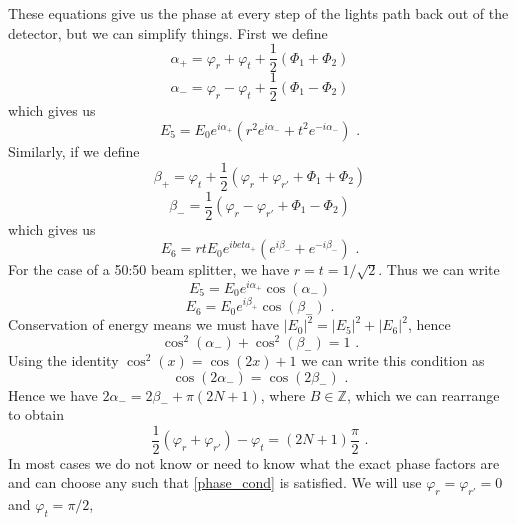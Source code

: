 \documentclass[11pt]{cuthesis}
\newcommand{\fs}{\text{ .}}
\begin{document}
These equations give us the phase at every step of the lights path back out of the detector, but we can simplify things. First we define 
\begin{equation}
\alpha_+ = \varphi_r + \varphi_t + \frac{1}{2}(\Phi_1+\Phi_2)
\end{equation}
\begin{equation}
\alpha_- = \varphi_r - \varphi_t + \frac{1}{2}(\Phi_1- \Phi_2)
\end{equation}
which gives us 
\begin{equation}
E_5=E_0 e^{i \alpha_+}(r^2 e^{i \alpha_-}+t^2 e^{-i \alpha_-}) \fs
\end{equation}
Similarly, if we define
\begin{equation}
\beta_+ = \varphi_t +\frac{1}{2}(\varphi_r+\varphi_{r'}+\Phi_1+\Phi_2)	
\end{equation}
\begin{equation}
\beta_-=\frac{1}{2}(\varphi_r-\varphi_{r'}+\Phi_1-\Phi_2) 
\end{equation}
which gives us 
\begin{equation}
E_6=r t E_0 e^{i beta_+}( e^{i \beta_-}+ e^{-i \beta_-}) \fs
\end{equation}
For the case of a 50:50 beam splitter, we have $r=t=1/\sqrt{2}$. Thus we can write
\begin{equation}
E_5=E_0 e^{i\alpha_+} \cos(\alpha_-)
\end{equation}
\begin{equation}
E_6=E_0 e^{i\beta_+} \cos(\beta_-) \fs
\end{equation}
Conservation of energy means we must have $|E_0|^2=|E_5|^2+|E_6|^2$, hence
\begin{equation}
\cos^2(\alpha_-)+\cos^2(\beta_-)=1 \fs
\end{equation}
Using the identity $\cos^2(x)=\cos(2x)+1$ we can write this condition as
\begin{equation}
\cos(2\alpha_-)=\cos(2\beta_-) \fs
\end{equation}
Hence we have $2\alpha_-=2\beta_- +\pi(2N+1)$, where $B\in \mathbb{Z}$, which we can rearrange to obtain
\begin{equation} \label{phase_cond}
\frac{1}{2}(\varphi_r+\varphi_{r'})-\varphi_t=(2N+1)\frac{\pi}{2} \fs
\end{equation}
In most cases we do not know or need to know what the exact phase factors are and can choose any such that \ref{phase_cond} is satisfied. We will use $\varphi_r=\varphi_{r'}=0$ and $\varphi_t=\pi/2$, %
\end{document}
